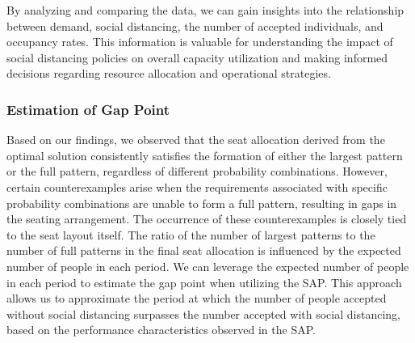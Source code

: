 By analyzing and comparing the data, we can gain insights into the relationship between demand, social distancing, the number of accepted individuals, and occupancy rates. This information is valuable for understanding the impact of social distancing policies on overall capacity utilization and making informed decisions regarding resource allocation and operational strategies.

\subsubsection{Estimation of Gap Point}
Based on our findings, we observed that the seat allocation derived from the optimal solution consistently satisfies the formation of either the largest pattern or the full pattern, regardless of different probability combinations. However, certain counterexamples arise when the requirements associated with specific probability combinations are unable to form a full pattern, resulting in gaps in the seating arrangement. The occurrence of these counterexamples is closely tied to the seat layout itself. The ratio of the number of largest patterns to the number of full patterns in the final seat allocation is influenced by the expected number of people in each period. We can leverage the expected number of people in each period to estimate the gap point when utilizing the SAP. This approach allows us to approximate the period at which the number of people accepted without social distancing surpasses the number accepted with social distancing, based on the performance characteristics observed in the SAP.

